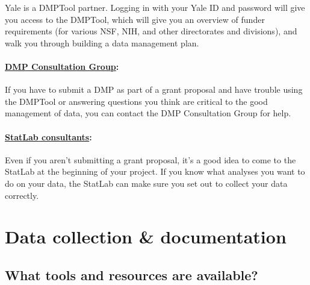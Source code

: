 \documentclass{tufte-handout}
\begin{document}
Yale is a DMPTool partner. Logging in with your Yale ID and password
will give you access to the DMPTool, which will give you an overview of
funder requirements (for various NSF, NIH, and other directorates and
divisions), and walk you through building a data management plan.

\paragraph{\href{http://csssi.yale.edu/dmp}{DMP Consultation
Group}:}\label{dmp-consultation-group}

If you have to submit a DMP as part of a grant proposal and have trouble
using the DMPTool or answering questions you think are critical to the
good management of data, you can contact the DMP Consultation Group for
help.

\paragraph{\href{http://csssi.yale.edu/csssi-statistical-consultants-schedule}{StatLab
consultants}:}\label{statlab-consultants}

Even if you aren't submitting a grant proposal, it's a good idea to come
to the StatLab at the beginning of your project. If you know what
analyses you want to do on your data, the StatLab can make sure you set
out to collect your data correctly.

\section{Data collection \& documentation}\label{data-collection-documentation} 

\subsection{What tools and resources are
available?}\label{what-tools-and-resources-are-available-1}
\end{document}
